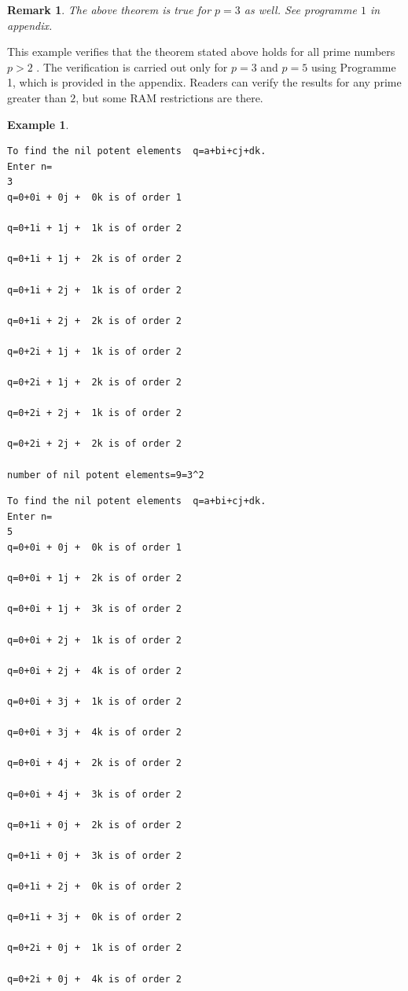 \documentclass[sn-mathphys,Numbered]{sn-jnl}%
\theoremstyle{thmstyleone}
\theoremstyle{thmstyletwo}
\newtheorem{example}{Example}
\newtheorem{remark}{Remark}
\theoremstyle{thmstylethree}
\begin{document}
\begin{remark}
The above theorem is true for $p=3$ as well. See programme $1$ in appendix. 
\end{remark}
This example verifies that the theorem stated above holds for all prime numbers $p > 2$ . The verification is carried out only for $p=3$ and $p=5$ using Programme 1, which is provided in the appendix. Readers can verify the results for any prime greater than $2$, but some RAM restrictions are there.
\begin{example}
\begin{verbatim}
To find the nil potent elements  q=a+bi+cj+dk.
Enter n=
3
q=0+0i + 0j +  0k is of order 1

q=0+1i + 1j +  1k is of order 2

q=0+1i + 1j +  2k is of order 2

q=0+1i + 2j +  1k is of order 2

q=0+1i + 2j +  2k is of order 2

q=0+2i + 1j +  1k is of order 2

q=0+2i + 1j +  2k is of order 2

q=0+2i + 2j +  1k is of order 2

q=0+2i + 2j +  2k is of order 2

number of nil potent elements=9=3^2
\end{verbatim}
\begin{verbatim}
To find the nil potent elements  q=a+bi+cj+dk.
Enter n=
5
q=0+0i + 0j +  0k is of order 1

q=0+0i + 1j +  2k is of order 2

q=0+0i + 1j +  3k is of order 2

q=0+0i + 2j +  1k is of order 2

q=0+0i + 2j +  4k is of order 2

q=0+0i + 3j +  1k is of order 2

q=0+0i + 3j +  4k is of order 2

q=0+0i + 4j +  2k is of order 2

q=0+0i + 4j +  3k is of order 2

q=0+1i + 0j +  2k is of order 2

q=0+1i + 0j +  3k is of order 2

q=0+1i + 2j +  0k is of order 2

q=0+1i + 3j +  0k is of order 2

q=0+2i + 0j +  1k is of order 2

q=0+2i + 0j +  4k is of order 2


\end{verbatim}
\end{example}
\end{document}
